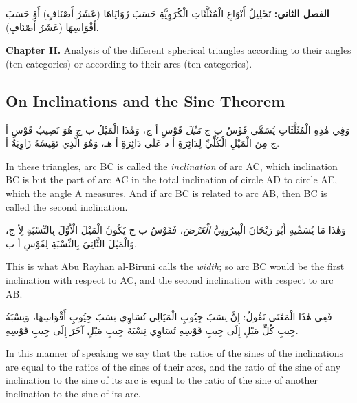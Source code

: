\documentclass[11pt,a4paper]{article}
\theoremstyle{plain}
\theoremstyle{definition}
\theoremstyle{remark}
\newcommand{\ar}[1]{{\arabicfont\beginR #1\endR}}
\newcommand{\bilingualpair}[2]{%
  \par\noindent
  \begin{minipage}[t]{0.48\textwidth}
  #1
  \end{minipage}%
  \hfill
  \begin{minipage}[t]{0.48\textwidth}
  \vspace*{0pt}#2
  \end{minipage}\par\vspace{0.3cm}%
}
\begin{document}
\vspace{0.3cm}

\bilingualpair{\ar{\textbf{الفصل الثاني:} تَحْلِيلُ أَنْوَاعِ الْمُثَلَّثَاتِ الْكُرَوِيَّةِ حَسَبَ زَوَايَاهَا (عَشَرُ أَصْنَافٍ) أَوْ حَسَبَ أَقْوَاسِهَا (عَشَرُ أَصْنَافٍ).}}{\noindent\textbf{Chapter II.} Analysis of the different spherical triangles according to their angles (ten categories) or according to their arcs (ten categories).}

\vspace{0.5cm}

\subsection{On Inclinations and the Sine Theorem}
\label{sec:inclinations}

\bilingualpair{\ar{وَفِي هٰذِهِ الْمُثَلَّثَاتِ يُسَمَّى قَوْسُ ب ج \textit{مَيْلَ} قَوْسِ أ ج، وَهٰذَا الْمَيْلُ ب ج هُوَ نَصِيبُ قَوْسِ أ ج مِنَ الْمَيْلِ الْكُلِّيِّ لِدَائِرَةِ أ د عَلَى دَائِرَةِ أ هـ، وَهُوَ الَّذِي تَقِيسُهُ زَاوِيَةُ أ.}}{In these triangles, arc BC is called the \textit{inclination} of arc AC, which inclination BC is but the part of arc AC in the total inclination of circle AD to circle AE, which the angle A measures. And if arc BC is related to arc AB, then BC is called the second inclination.}

\vspace{0.3cm}

\bilingualpair{\ar{وَهٰذَا مَا يُسَمِّيهِ أَبُو رَيْحَانَ الْبِيرُونِيُّ \textit{الْعَرْضَ}، فَقَوْسُ ب ج يَكُونُ الْمَيْلَ الْأَوَّلَ بِالنِّسْبَةِ لِأ ج، وَالْمَيْلَ الثَّانِيَ بِالنِّسْبَةِ لِقَوْسِ أ ب.}}{This is what Abu Rayhan al-Biruni calls the \textit{width}; so arc BC would be the first inclination with respect to AC, and the second inclination with respect to arc AB.}

\vspace{0.3cm}

\bilingualpair{\ar{فَفِي هٰذَا الْمَعْنَى نَقُولُ: إِنَّ نِسَبَ جِيُوبِ الْمَيَالِي تُسَاوِي نِسَبَ جِيُوبِ أَقْوَاسِهَا، وَنِسْبَةُ جِيبِ كُلِّ مَيْلٍ إِلَى جِيبِ قَوْسِهِ تُسَاوِي نِسْبَةَ جِيبِ مَيْلٍ آخَرَ إِلَى جِيبِ قَوْسِهِ.}}{In this manner of speaking we say that the ratios of the sines of the inclinations are equal to the ratios of the sines of their arcs, and the ratio of the sine of any inclination to the sine of its arc is equal to the ratio of the sine of another inclination to the sine of its arc.}

\vspace{0.3cm}
\end{document}
